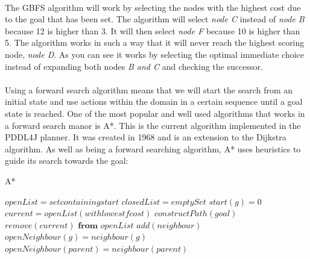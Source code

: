 \\
The GBFS algorithm will work by selecting the nodes with the highest cost due to the goal that has been set. The algorithm will select \textit{node C} instead of \textit{node B} because 12 is higher than 3. It will then select \textit{node F} because 10 is higher than 5. The algorithm works in such a way that it will never reach the highest scoring node, \textit{node D}. As you can see it works by selecting the optimal immediate choice instead of expanding both nodes \textit{B and C} and checking the successor.
\\
\\
Using a forward search algorithm means that we will start the search from an initial state and use actions within the domain in a certain sequence until a goal state is reached. One of the most popular and well used algorithms that works in a forward search manor is A*. This is the current algorithm implemented in the PDDL4J planner. It was created in 1968 and is an extension to the Dijkstra algorithm\cite{MinimumCostPaths}. As well as being a forward searching algorithm, A* uses heuristics to guide its search towards the goal:

\begin{algorithm}
\caption{A*}
\begin{algorithmic}
\State $openList = set containing start$
\State $closedList = emptySet$
\State $start(g) = 0$
\State $current = openList(with lowest f cost)$
\State $constructPath(goal)$
\EndIf
\State $remove(current) \textbf{ from } openList$
\State $add(neighbour)$
\EndIf
{}
\State $openNeighbour(g) = neighbour(g)$
\State $openNeighbour(parent) = neighbour(parent)$
\EndIf
\EndFor
\EndWhile
\end{algorithmic}
\end{algorithm}

